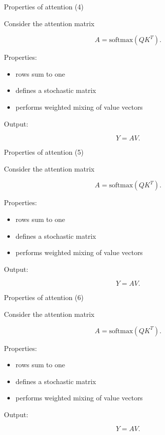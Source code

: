 \documentclass[aspectratio=169]{beamer}
\begin{document}
\begin{frame}{Properties of attention (4)}

Consider the attention matrix

\[
A = \text{softmax}(QK^T).
\]

Properties:

\begin{itemize}
\item rows sum to one
\item defines a stochastic matrix
\item performs weighted mixing of value vectors
\end{itemize}

Output:

\[
Y = AV.
\]

\end{frame}


\begin{frame}{Properties of attention (5)}

Consider the attention matrix

\[
A = \text{softmax}(QK^T).
\]

Properties:

\begin{itemize}
\item rows sum to one
\item defines a stochastic matrix
\item performs weighted mixing of value vectors
\end{itemize}

Output:

\[
Y = AV.
\]

\end{frame}


\begin{frame}{Properties of attention (6)}

Consider the attention matrix

\[
A = \text{softmax}(QK^T).
\]

Properties:

\begin{itemize}
\item rows sum to one
\item defines a stochastic matrix
\item performs weighted mixing of value vectors
\end{itemize}

Output:

\[
Y = AV.
\]

\end{frame}
\end{document}
